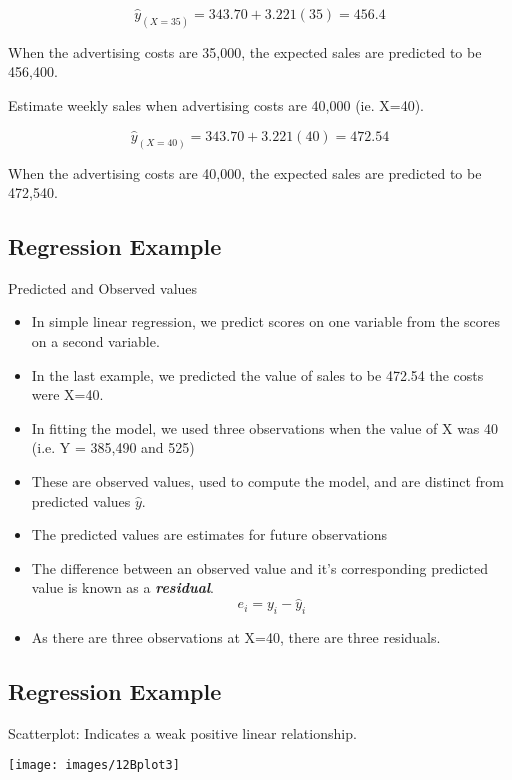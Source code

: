 	\[ \hat{y}_{(X=35)} = 343.70 + 3.221(35)  = 456.4 \]
	
	When the advertising costs are 35,000, the expected sales are predicted to be 456,400.
	
	Estimate weekly sales when advertising costs are 40,000 (ie. X=40).
	
	
	\[ \hat{y}_{(X=40)} = 343.70 + 3.221(40)  = 472.54 \]
	
	When the advertising costs are 40,000, the expected sales are predicted to be 472,540.
	
	
	\subsection{Regression Example}
	
	Predicted and Observed values
	\begin{itemize}
		\item In simple linear regression, we predict scores on one variable from the scores on a second variable.
		\item In the last example, we predicted the value of sales to be 472.54 the costs were X=40.
		\item In fitting the model, we used three observations when the value of X was 40 (i.e. Y = 385,490 and 525)
		\item These are observed values, used to compute the model, and are distinct from predicted values $\hat{y}$.
		\item The predicted values are estimates for future observations
		\item The difference between an observed value and it's corresponding predicted value is known as a \textbf{\textit{residual}}.
		\[e_i = y_i-\hat{y}_i \]
		\item As there are three observations at X=40, there are three residuals.
	\end{itemize}
	
	
	
	\subsection{Regression Example}
	Scatterplot: Indicates a weak positive linear relationship.
	
	\begin{center}
		\texttt{[image: images/12Bplot3]}
	\end{center}
	
